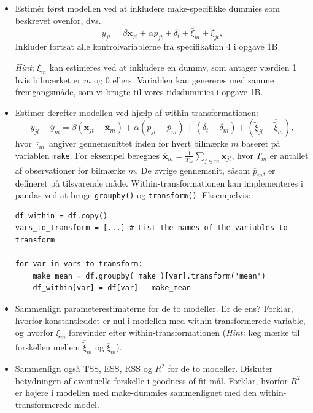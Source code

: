\documentclass[a4paper,12pt]{article}
\begin{document}
\begin{itemize}
    \item Estimér først modellen ved at inkludere make-specifikke dummies som beskrevet ovenfor, dvs. 
    \begin{equation}
        y_{jt} = \beta \mathbf{x}_{jt} + \alpha p_{jt} + \delta_{t} + \bar{\xi}_m + \tilde{\xi}_{jt}, \label{eq:make_fixed_effects_model}
    \end{equation}
    Inkluder fortsat alle kontrolvariablerne fra specifikation 4 i opgave 1B.

    \textit{Hint}: $\bar{\xi}_m$ kan estimeres ved at inkludere en dummy, som antager værdien 1 hvis bilmærket er $m$ og 0 ellers. Variablen kan genereres  med samme fremgangsmåde, som vi brugte til vores tidsdummies i opgave 1B.


    \item Estimer derefter modellen ved hjælp af within-transformationen:
\begin{equation}
    y_{jt} - \overline{y}_{m} = \beta \left(\mathbf x_{jt} - \overline{\mathbf x}_{m}\right) + \alpha \left(p_{jt} - \overline{p}_{m}\right) + (\delta_{t} - \overline{\delta}_m) + (\tilde{\xi}_{jt} - \overline{\tilde{\xi}}_{m}),
\end{equation}
hvor \( \overline{\cdot}_m \) angiver gennemsnittet inden for hvert bilmærke \( m \) baseret på variablen \texttt{make}.
For eksempel beregnes $\overline{\mathbf x}_{m} = \frac{1}{T_{m}} \sum_{j \in m} \mathbf x_{jt}$, hvor $T_{m}$ er antallet af observationer for bilmærke $ m $. De øvrige gennemsnit, såsom $\overline{p}_{m}$, er defineret på tilsvarende måde. Within-transformationen kan implementeres i pandas ved at bruge \texttt{groupby()} og \texttt{transform()}. Eksempelvis:

\begin{verbatim}
df_within = df.copy()
vars_to_transform = [...] # List the names of the variables to transform

for var in vars_to_transform:
    make_mean = df.groupby('make')[var].transform('mean')
    df_within[var] = df[var] - make_mean
\end{verbatim}

\item Sammenlign parameterestimaterne for de to modeller. Er de ens? Forklar, hvorfor konstantleddet er nul i modellen med within-transformerede variable, og hvorfor \( \bar{\xi}_m \) forsvinder efter within-transformationen (\textit{Hint:} læg mærke til forskellen mellem $\overline{\tilde{\xi}}_{m}$ og $\overline{{\xi}}_{m}$).

\item Sammenlign også TSS, ESS, RSS og \( R^2 \) for de to modeller. Diskuter betydningen af eventuelle forskelle i goodness-of-fit mål. Forklar, hvorfor \( R^2 \) er højere i modellen med make-dummies sammenlignet med den within-transformerede model.

\end{itemize}
\hrulefill
\end{document}
